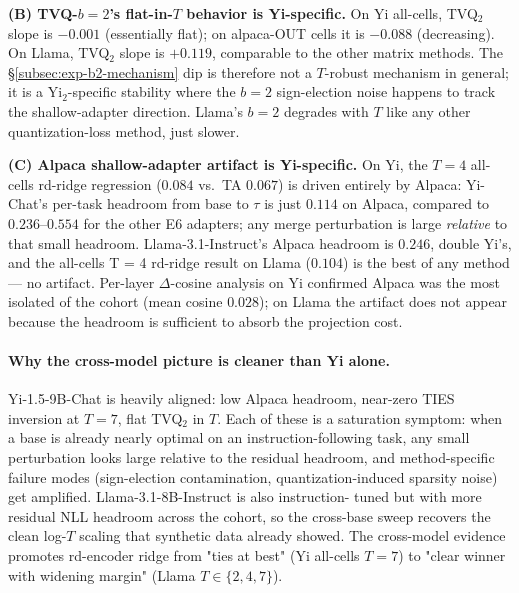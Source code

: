 \textbf{(B) TVQ-$b{=}2$'s flat-in-$T$ behavior is Yi-specific.} On
Yi all-cells, TVQ$_2$ slope is $-0.001$ (essentially flat); on
alpaca-OUT cells it is $-0.088$ (decreasing). On Llama, TVQ$_2$
slope is $+0.119$, comparable to the other matrix methods. The
\S\ref{subsec:exp-b2-mechanism} dip is therefore not a $T$-robust
mechanism in general; it is a Yi$_2$-specific stability where the
$b{=}2$ sign-election noise happens to track the shallow-adapter
direction. Llama's $b{=}2$ degrades with $T$ like any other
quantization-loss method, just slower.

\textbf{(C) Alpaca shallow-adapter artifact is Yi-specific.} On Yi,
the $T = 4$ all-cells rd-ridge regression ($0.084$ vs.\ TA $0.067$)
is driven entirely by Alpaca: Yi-Chat's per-task headroom from base
to $\tau$ is just $0.114$ on Alpaca, compared to $0.236$--$0.554$
for the other E6 adapters; any merge perturbation is large
\emph{relative} to that small headroom. Llama-3.1-Instruct's Alpaca
headroom is $0.246$, double Yi's, and the all-cells T = 4 rd-ridge
result on Llama ($0.104$) is the best of any method --- no
artifact. Per-layer $\Delta$-cosine analysis on Yi confirmed Alpaca
was the most isolated of the cohort (mean cosine $0.028$); on Llama
the artifact does not appear because the headroom is sufficient to
absorb the projection cost.

\paragraph{Why the cross-model picture is cleaner than Yi alone.}
Yi-1.5-9B-Chat is heavily aligned: low Alpaca headroom, near-zero
TIES inversion at $T = 7$, flat TVQ$_2$ in $T$. Each of these is a
saturation symptom: when a base is already nearly optimal on an
instruction-following task, any small perturbation looks large
relative to the residual headroom, and method-specific failure
modes (sign-election contamination, quantization-induced sparsity
noise) get amplified. Llama-3.1-8B-Instruct is also instruction-
tuned but with more residual NLL headroom across the cohort, so
the cross-base sweep recovers the clean log-$T$ scaling that
synthetic data already showed. The cross-model evidence promotes
rd-encoder ridge from "ties at best" (Yi all-cells $T = 7$) to
"clear winner with widening margin" (Llama $T \in \{2, 4, 7\}$).

